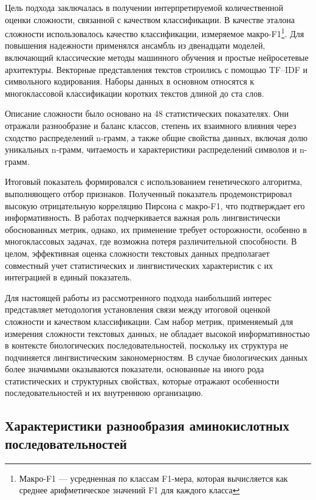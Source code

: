 \documentclass[specification,annotation,times]{itmo-student-thesis}
\begin{document}
Цель подхода заключалась в получении интерпретируемой количественной оценки сложности, связанной с качеством классификации. В качестве эталона сложности использовалось качество классификации, измеряемое макро-F1\footnote{Макро-F1 --- усредненная по классам F1-мера, которая вычисляется как среднее арифметическое значений F1 для каждого класса}. Для повышения надежности применялся ансамбль из двенадцати моделей, включающий классические методы машинного обучения и простые нейросетевые архитектуры. Векторные представления текстов строились с помощью TF–IDF и символьного кодирования. Наборы данных в основном относятся к многоклассовой классификации коротких текстов длиной до ста слов.

Описание сложности было основано на 48 статистических показателях. Они отражали разнообразие и баланс классов, степень их взаимного влияния через сходство распределений n-грамм, а также общие свойства данных, включая долю уникальных n-грамм, читаемость и характеристики распределений символов и n-грамм.

Итоговый показатель формировался с использованием генетического алгоритма, выполняющего отбор признаков. Полученный показатель продемонстрировал высокую отрицательную корреляцию Пирсона с макро-F1, что подтверждает его информативность. В работах подчеркивается важная роль лингвистически обоснованных метрик, однако, их применение требует осторожности, особенно в многоклассовых задачах, где возможна потеря различительной способности. В целом, эффективная оценка сложности текстовых данных предполагает совместный учет статистических и лингвистических характеристик с их интеграцией в единый показатель.

Для настоящей работы из рассмотренного подхода наибольший интерес представляет методология установления связи между итоговой оценкой сложности и качеством классификации. Сам набор метрик, применяемый для измерения сложности текстовых данных, не обладает высокой информативностью в контексте биологических последовательностей, поскольку их структура не подчиняется лингвистическим закономерностям. В случае биологических данных более значимыми оказываются показатели, основанные на иного рода статистических и структурных свойствах, которые отражают особенности последовательностей и их внутреннюю организацию.

\subsection{Характеристики разнообразия аминокислотных последовательностей}
\end{document}

